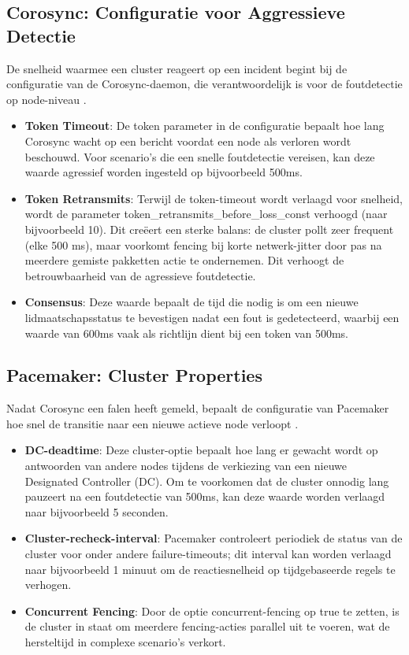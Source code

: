 \subsection{Corosync: Configuratie voor Aggressieve Detectie}
De snelheid waarmee een cluster reageert op een incident begint bij de configuratie van de Corosync-daemon, die verantwoordelijk is voor de foutdetectie op node-niveau \autocite{Die, Cubepath2026}.

\begin{itemize}
    \item \textbf{Token Timeout}: De token parameter in de configuratie bepaalt hoe lang Corosync wacht op een bericht voordat een node als verloren wordt beschouwd. Voor scenario's die een snelle foutdetectie vereisen, kan deze waarde agressief worden ingesteld op bijvoorbeeld 500ms.
    \item \textbf{Token Retransmits}: Terwijl de token-timeout wordt verlaagd voor snelheid, wordt de parameter token\_retransmits\_before\_loss\_const verhoogd (naar bijvoorbeeld 10). Dit creëert een sterke balans: de cluster pollt zeer frequent (elke 500 ms), maar voorkomt fencing bij korte netwerk-jitter door pas na meerdere gemiste pakketten actie te ondernemen. Dit verhoogt de betrouwbaarheid van de agressieve foutdetectie.
    \item \textbf{Consensus}: Deze waarde bepaalt de tijd die nodig is om een nieuwe lidmaatschapsstatus te bevestigen nadat een fout is gedetecteerd, waarbij een waarde van 600ms vaak als richtlijn dient bij een token van 500ms.
\end{itemize}

\subsection{Pacemaker: Cluster Properties}
Nadat Corosync een falen heeft gemeld, bepaalt de configuratie van Pacemaker hoe snel de transitie naar een nieuwe actieve node verloopt \autocite{ClusterLabs, Cubepath2026}.

\begin{itemize}
    \item \textbf{DC-deadtime}: Deze cluster-optie bepaalt hoe lang er gewacht wordt op antwoorden van andere nodes tijdens de verkiezing van een nieuwe Designated Controller (DC). Om te voorkomen dat de cluster onnodig lang pauzeert na een foutdetectie van 500ms, kan deze waarde worden verlaagd naar bijvoorbeeld 5 seconden.
    \item \textbf{Cluster-recheck-interval}: Pacemaker controleert periodiek de status van de cluster voor onder andere failure-timeouts; dit interval kan worden verlaagd naar bijvoorbeeld 1 minuut om de reactiesnelheid op tijdgebaseerde regels te verhogen.
    \item \textbf{Concurrent Fencing}: Door de optie concurrent-fencing op true te zetten, is de cluster in staat om meerdere fencing-acties parallel uit te voeren, wat de hersteltijd in complexe scenario's verkort.
\end{itemize}

